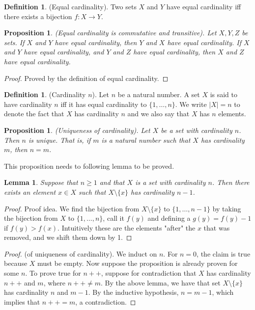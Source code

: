\documentclass[12pt]{article}
\newtheorem{lemma}[theorem]{Lemma}
\newtheorem{proposition}[theorem]{Proposition}
\theoremstyle{definition}
\newtheorem{definition}[theorem]{Definition}
\theoremstyle{remark}
\begin{document}
\begin{definition}
    (Equal cardinality). Two sets $X$ and $Y$ have equal cardinality iff there exists a bijection $f \colon X \to Y$.
\end{definition}

\begin{proposition}
    (Equal cardinality is commutative and transitive). Let $X, Y, Z$ be sets. If $X$ and $Y$ have equal cardinality, then $Y$ and $X$ have equal cardinality. If $X$ and $Y$ have equal cardinality, and $Y$ and $Z$ have equal cardinality, then $X$ and $Z$ have equal cardinality.
\end{proposition}

\begin{proof}
    Proved by the definition of equal cardinality.
\end{proof}

\begin{definition}
    (Cardinality $n$). Let $n$ be a natural number. A set $X$ is said to have cardinality $n$ iff it has equal cardinality to $\{1, \dots, n\}$. We write $|X| = n$ to denote the fact that $X$ has cardinality $n$ and we also say that $X$ has $n$ elements.
\end{definition}

\begin{proposition}
    (Uniqueness of cardinality). Let $X$ be a set with cardinality $n$. Then $n$ is unique. That is, if $m$ is a natural number such that $X$ has cardinality $m$, then $n = m$.
\end{proposition}

This proposition needs to following lemma to be proved.

\begin{lemma}
    Suppose that $n \geq 1$ and that $X$ is a set with cardinality $n$. Then there exists an element $x \in X$ such that $X \setminus \{x\}$ has cardinality $n-1$.
\end{lemma}

\begin{proof}
    Proof idea. We find the bijection from $X \setminus \{x\}$ to $\{1, \dots, n-1\}$ by taking the bijection from $X$ to $\{1, \dots, n\}$, call it $f(y)$ and defining a $g(y) = f(y) - 1$ if $f(y) > f(x)$. Intuitively these are the elements "after" the $x$ that was removed, and we shift them down by 1.
\end{proof}

\begin{proof}
    (of uniqueness of cardinality). We induct on $n$. For $n = 0$, the claim is true because $X$ must be empty. Now suppose the proposition is already proven for some $n$. To prove true for $n++$, suppose for contradiction that $X$ has cardinality $n++$ and $m$, where $n++ \neq m$. By the above lemma, we have that set $X \setminus \{x\}$ has cardinality $n$ and $m - 1$. By the inductive hypothesis, $n = m - 1$, which implies that $n ++ = m$, a contradiction.
\end{proof}
\end{document}

